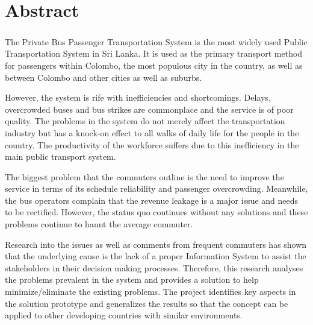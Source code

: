 \clearpage
\chapter*{Abstract}

\paragraph{ } The Private Bus Passenger Transportation System is the most widely used Public Transportation System in Sri Lanka. It is used as the primary transport method for passengers within Colombo, the most populous city in the country, as well as between Colombo and other cities as well as suburbs.

However, the system is rife with inefficiencies and shortcomings. Delays, overcrowded buses and bus strikes are commonplace and the service is of poor quality. The problems in the system do not merely affect the transportation industry but has a knock-on effect to all walks of daily life for the people in the country. The productivity of the workforce suffers due to this inefficiency in the main public transport system.

The biggest problem that the commuters outline is the need to improve the service in terms of its schedule reliability and passenger overcrowding. Meanwhile, the bus operators complain that the revenue leakage is a major issue and needs to be rectified. However, the status quo continues without any solutions and these problems continue to haunt the average commuter.

Research into the issues as well as comments from frequent commuters has shown that the underlying cause is the lack of a proper Information System to assist the stakeholders in their decision making processes. Therefore, this research analyses the problems prevalent in the system and provides a solution to help minimize/eliminate the existing problems. The project identifies key aspects in the solution prototype and generalizes the results so that the concept can be applied to other developing countries with similar environments.